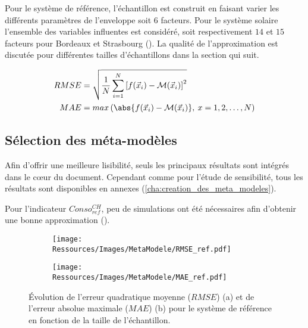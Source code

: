 Pour le système de référence, l’échantillon est construit en faisant varier les différents
paramètres de l’enveloppe soit $6$ facteurs. Pour le système solaire l’ensemble des
variables influentes est considéré, soit respectivement $14$ et $15$ facteurs pour
Bordeaux et Strasbourg ().
La qualité de l’approximation est discutée pour différentes tailles d’échantillons
dans la section qui suit.

\begin{align}
  \label{eq:rmse}
  RMSE &= \sqrt{\frac{1}{N}\sum^{N}_{i=1} \left[ f(\vec{x}_{i}) - \mathcal{M}(\vec{x}_{i}) \right]^{2} } \\
  \label{eq:mae}
  MAE  &= max \left( \abs{f(\vec{x}_{i}) - \mathcal{M}(\vec{x}_{i})}, \: x = 1, 2, \dotsc, N \right)
\end{align}



\subsection{Sélection des méta-modèles} %
\label{sub:selection_des_meta_modeles}
Afin d’offrir une meilleure lisibilité, seuls les principaux résultats sont intégrés dans
le cœur du document. Cependant comme pour l’étude de sensibilité, tous
les résultats sont disponibles en annexes (\ref{cha:creation_des_meta_modeles}).

Pour l’indicateur $Conso_{ref}^{CH}$, peu de simulations ont été nécessaires afin
d’obtenir une bonne approximation ().

\begin{figure}
    \centering
    \begin{subfigure}[b]{0.48\textwidth}
        \centering
        \texttt{[image: Ressources/Images/MetaModele/RMSE\_ref.pdf]}
        \caption{}
        \label{fig:rmse_qualite_ref}
    \end{subfigure}
    \quad
    \begin{subfigure}[b]{0.48\textwidth}
        \centering
        \texttt{[image: Ressources/Images/MetaModele/MAE\_ref.pdf]}
        \caption{}
        \label{fig:mae_qualite_ref}
    \end{subfigure}
    \caption[Évolution de la fidélité du méta-modèle pour le système de référence]
            {Évolution de l’erreur quadratique moyenne ($RMSE$) (a) et de l’erreur absolue
             maximale ($MAE$) (b) pour le système de référence en fonction de la taille de
             l’échantillon.}
    \label{fig:mae_rmse_qualite_ref}
\end{figure}

